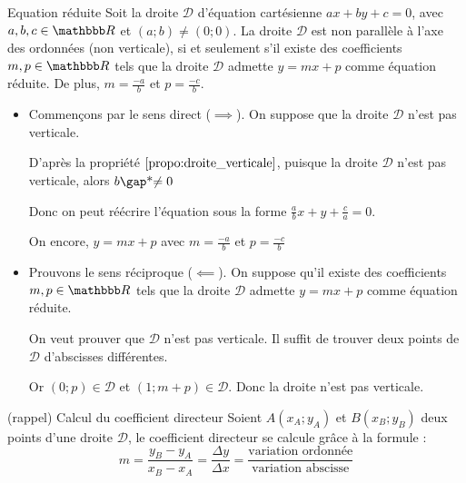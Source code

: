 \documentclass[10pt,a4paper,openany,twoside, prof]{book}
\begin{document}
\begin{prop}{Equation réduite}{}
   Soit la droite $\mathcal{D}$ d'équation cartésienne $ax+by+c=0$, avec $a,b,c\in\R$ et $(a;b)\ne(0;0)$.
   \medskip
   La droite $\mathcal{D}$ est non parallèle à l'axe des ordonnées (non verticale), si et seulement s'il existe des coefficients $m,p\in\R$ tels que la droite $\mathcal{D}$ admette $y =mx+p$ comme équation réduite.
   \medskip
   De plus, $m=\frac{-a}{b}$ et $p=\frac{-c}{b}$.
\end{prop}

\begin{dem}{}{}
   \begin{itemize}
      \item Commençons par le sens direct ($\implies$). On suppose que la droite $\mathcal{D}$ n'est pas verticale.

      D'après la propriété $\ref{propo:droite_verticale}$, puisque la droite $\mathcal{D}$ n'est pas verticale, alors $b\troum{\ne 0}$
      \begin{reponse}
         Donc on peut réécrire l'équation sous la forme $\frac{a}{b}x+y+\frac{c}{a}=0$.

         On encore, $y=mx+p$ avec $m=\frac{-a}{b}$ et $p=\frac{-c}{b}$
      \end{reponse}
      \item Prouvons le sens réciproque ($\impliedby$). On suppose qu'il existe des coefficients $m,p\in\R$ tels que la droite $\mathcal{D}$ admette $y =mx+p$ comme équation réduite.
      \begin{reponse}

         On veut prouver que $\mathcal{D}$ n'est pas verticale. Il suffit de trouver deux points de $\mathcal{D}$ d'abscisses différentes.

         Or $(0;p)\in\mathcal{D}$ et $(1;m+p)\in\mathcal{D}$. Donc la droite n'est pas verticale.
      \end{reponse}
   \end{itemize}

\end{dem}

\begin{prop}{(rappel) Calcul du coefficient directeur}{}
   Soient $A(x_A;y_A)$ et $B(x_B;y_B)$ deux points d'une droite $\mathcal{D}$, le coefficient directeur se calcule grâce à la formule : $$m=\frac{y_B-y_A}{x_B-x_A}=\frac{\Delta y}{\Delta x}=\frac{\text{variation ordonnée}}{\text{variation abscisse}}$$
\end{prop}
\end{document}
